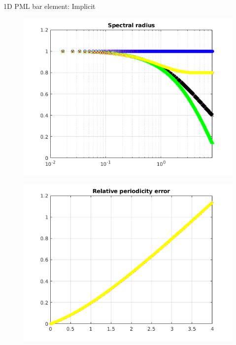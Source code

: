 \begin{frame}{1D PML bar element: Implicit}
\begin{figure}[ht]
\begin{minipage}[b]{0.5\linewidth}
  \end{minipage}%
  \begin{minipage}[b]{0.5\linewidth}
    \centering
    \includegraphics[scale=.35]{images/pml1d-imp-2.png} \\
  \end{minipage} 
  \begin{minipage}[b]{0.5\linewidth}
    \centering
    \includegraphics[scale=.35]{images/pml1d-imp-3.png} \\


\end{minipage}
\end{figure}
\end{frame}
